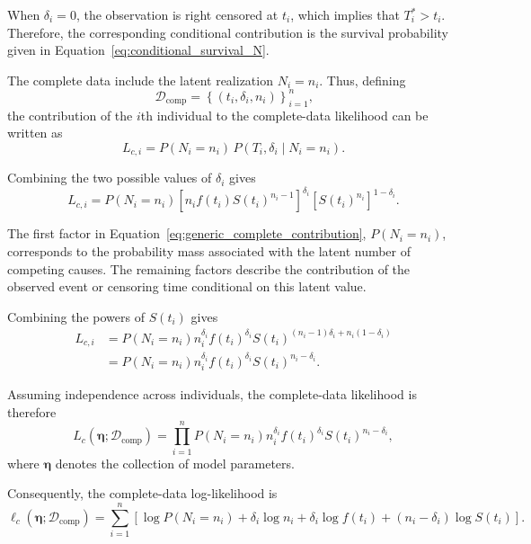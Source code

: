 When $\delta_i=0$, the observation is right censored at $t_i$, which implies
that $T_i^*>t_i$. Therefore, the corresponding conditional contribution
is the survival probability given in Equation~\eqref{eq:conditional_survival_N}.

The complete data include the latent realization $N_i=n_i$. Thus, defining
\begin{equation}
    \mathcal{D}_{\mathrm{comp}} = \left\{ (t_i,\delta_i,n_i) \right\}^{n}_{i=1}\text{,}
\end{equation}
the contribution of the $i$th individual to the complete-data likelihood
can be written as
\begin{equation}
\label{eq:joint_complete_factorization}
L_{c,i}
=
P(N_i=n_i)\,
P(T_i,\delta_i\mid N_i=n_i).
\end{equation}

Combining the two possible values of $\delta_i$ gives
\begin{equation}
\label{eq:generic_complete_contribution}
L_{c,i}
=
P(N_i=n_i)
\left[
n_i f(t_i)S(t_i)^{n_i-1}
\right]^{\delta_i}
\left[
S(t_i)^{n_i}
\right]^{1-\delta_i}.
\end{equation}

The first factor in Equation~\eqref{eq:generic_complete_contribution},
$P(N_i=n_i)$, corresponds to the probability mass associated with the
latent number of competing causes. The remaining factors describe the
contribution of the observed event or censoring time conditional on this
latent value.

Combining the powers of $S(t_i)$ gives
\begin{align}
L_{c,i}
&=
P(N_i=n_i)
n_i^{\delta_i}
f(t_i)^{\delta_i}
S(t_i)^{(n_i-1)\delta_i+n_i(1-\delta_i)}
\nonumber\\
&=
P(N_i=n_i)
n_i^{\delta_i}
f(t_i)^{\delta_i}
S(t_i)^{n_i-\delta_i}.
\label{eq:generic_complete_contribution_simplified}
\end{align}

Assuming independence across individuals, the complete-data likelihood is
therefore
\begin{equation}
\label{eq:generic_complete_likelihood}
L_c
\left(
\boldsymbol{\eta};
\mathcal{D}_{\mathrm{comp}}
\right)
=
\prod_{i=1}^n
P(N_i=n_i)
n_i^{\delta_i}
f(t_i)^{\delta_i}
S(t_i)^{n_i-\delta_i},
\end{equation}
where $\boldsymbol{\eta}$ denotes the collection of model parameters.

Consequently, the complete-data log-likelihood is
\begin{equation}
\label{eq:generic_complete_loglikelihood}
\ell_c
\left(
\boldsymbol{\eta};
\mathcal{D}_{\mathrm{comp}}
\right)
=
\sum_{i=1}^n
\left[
\log P(N_i=n_i)
+
\delta_i\log n_i
+
\delta_i\log f(t_i)
+
(n_i-\delta_i)\log S(t_i)
\right].
\end{equation}

